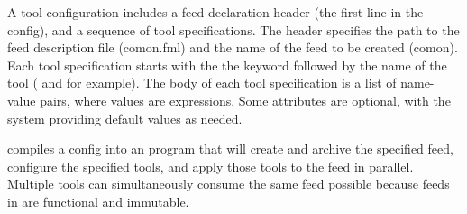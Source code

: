A tool configuration includes a feed declaration header 
(the first line in the config),
and a sequence of tool specifications. The header specifies the path to the 
feed description file (comon.fml) and the name of the feed to be created (comon).
Each tool specification starts with the the keyword  followed by the
name of the tool ( and  for example). The body of each tool specification is a list of name-value pairs, where values are \ocaml{} expressions. Some attributes are optional, with the system providing default values as needed. 

\padsd{} compiles a config into an \ocaml{} program that will create and archive the specified feed, configure the specified tools, and apply those tools to the feed in parallel. Multiple tools can simultaneously consume the same feed possible because feeds in
\padsd{} are functional and immutable. 



